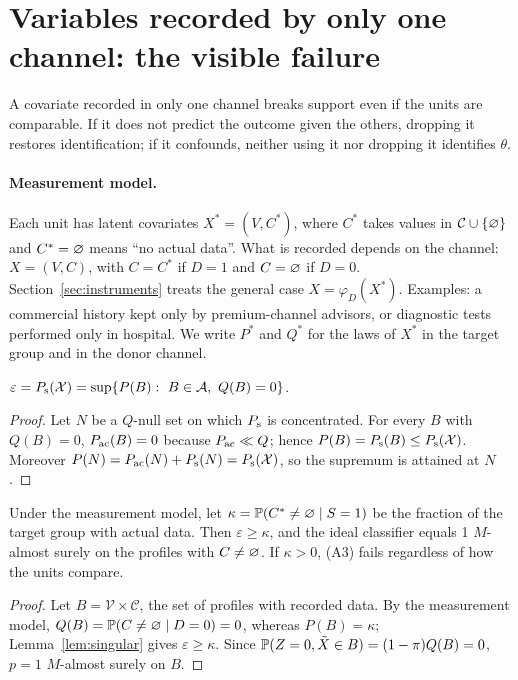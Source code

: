 \section{Variables recorded by only one channel: the visible failure}\label{sec:channel}

A covariate recorded in only one channel breaks support even if the units are comparable. If it does not predict the outcome given the others, dropping it restores identification; if it confounds, neither using it nor dropping it identifies $\theta$.

\paragraph{Measurement model.} Each unit has latent covariates $X^*=(V,C^*)$, where $C^*$ takes values in $\mathcal C\cup\{\varnothing\}$ and $C^*=\varnothing$ means ``no actual data''. What is recorded depends on the channel: $X=(V,C)$, with $C=C^*$ if $D=1$ and $C=\varnothing$ if $D=0$. Section~\ref{sec:instruments} treats the general case $X=\varphi_D(X^*)$. Examples: a commercial history kept only by premium-channel advisors, or diagnostic tests performed only in hospital. We write $P^*$ and $Q^*$ for the laws of $X^*$ in the target group and in the donor channel.

\begin{lemma}\label{lem:singular}
$\varepsilon=\Ps(\X)=\sup\{P(B):\ B\in\A,\ Q(B)=0\}$.
\end{lemma}
\begin{proof}
Let $N$ be a $Q$-null set on which $P_{\mathrm{s}}$ is concentrated. For every $B$ with $Q(B)=0$, $P_{\mathrm{ac}}(B)=0$ because $P_{\mathrm{ac}}\ll Q$; hence $P(B)=P_{\mathrm{s}}(B)\le P_{\mathrm{s}}(\mathcal{X})$. Moreover $P(N)=P_{\mathrm{ac}}(N)+P_{\mathrm{s}}(N)=P_{\mathrm{s}}(\mathcal{X})$, so the supremum is attained at $N$.
\end{proof}

\begin{proposition}\label{prop:breaks}
Under the measurement model, let $\kappa=\mathbb{P}(C^*\ne\varnothing\mid S=1)$ be the fraction of the target group with actual data. Then $\varepsilon\ge\kappa$, and the ideal classifier equals 1 $M$-almost surely on the profiles with $C\ne\varnothing$. If $\kappa>0$, (A3) fails regardless of how the units compare.
\end{proposition}
\begin{proof}
Let $B=\mathcal V\times\mathcal C$, the set of profiles with recorded data. By the measurement model, $Q(B)=\mathbb{P}(C\ne\varnothing\mid D=0)=0$, whereas $P(B)=\kappa$; Lemma~\ref{lem:singular} gives $\varepsilon\ge\kappa$. Since $\mathbb{P}(Z=0,\tilde X\in B)=(1-\pi)Q(B)=0$, $p=1$ $M$-almost surely on $B$.
\end{proof}

